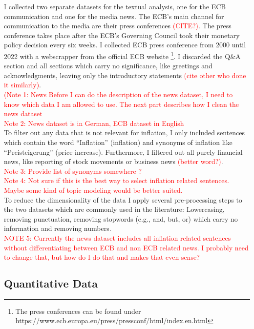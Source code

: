\documentclass[review]{elsarticle}
\begin{document}
I collected two separate datasets for the textual analysis, one for the ECB communication and one for the media news.
The ECB’s main channel for communication to the media are their press conferences \textcolor{red}{(CITE?)}. The press conference takes place after the ECB’s Governing Council took their monetary policy decision every six weeks. I collected ECB press conference from 2000 until 2022 with a webscrapper from the official ECB website \footnote[1]{The press conferences can be found under https://www.ecb.europa.eu/press/pressconf/html/index.en.html}. I discarded the Q\&A section and all sections which carry no significance, like greetings and acknowledgments, leaving only the introductory statements \textcolor{red}{(cite other who done it similarly)}.
\\
\textcolor{red}{(Note 1: News Before I can do the description of the news dataset, I need to know which data I am allowed to use. The next part describes how I clean the news dataset}
\\
\textcolor{red}{Note 2: News dataset is in German, ECB dataset in English}
\\
To filter out any data that is not relevant for inflation, I only included sentences which contain the word “Inflation” (inflation) and synonyms of inflation like “Preisteigerung” (price increase). Furthermore, I filtered out all purely financial news, like reporting of stock movements or business news \textcolor{red}{(better word?)}.
\\
\textcolor{red}{Note 3: Provide list of synonyms somewhere ?}
\\
\textcolor{red}{Note 4: Not sure if this is the best way to select inflation related sentences. Maybe some kind of topic modeling would be better suited.}
\\
To reduce the dimensionality of the data I apply several pre-processing steps to the two datasets which are commonly used in the literature: Lowercasing, removing punctuation, removing stopwords (e.g., and, but, or) which carry no information and removing numbers.
\\
\textcolor{red}{NOTE 5: Currently the news dataset includes all inflation related sentences without differentiating between ECB and non ECB related news. I probably need to change that, but how do I do that and makes that even sense?}

\subsection{Quantitative Data} \label{sec:Quantitative Data}
\end{document}
